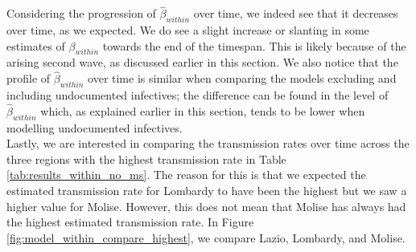 \documentclass[12pt]{article}
\begin{document}
	Considering the progression of $\widehat{\beta}_{within}$ over time, we indeed see that it decreases over time, as we expected. We do see a slight increase or slanting in some estimates of $\beta_{within}$ towards the end of the timespan. This is likely because of the arising second wave, as discussed earlier in this section. We also notice that the profile of $\widehat{\beta}_{within}$ over time is similar when comparing the models excluding and including undocumented infectives; the difference can be found in the level of $\widehat{\beta}_{within}$ which, as explained earlier in this section, tends to be lower when modelling undocumented infectives. \\
	
	Lastly, we are interested in comparing the transmission rates over time across the three regions with the highest transmission rate in Table \ref{tab:results_within_no_ms}. The reason for this is that we expected the estimated transmission rate for Lombardy to have been the highest but we saw a higher value for Molise. However, this does not mean that Molise has always had the highest estimated transmission rate. In Figure \ref{fig:model_within_compare_highest}, we compare Lazio, Lombardy, and Molise.
	
\end{document}

